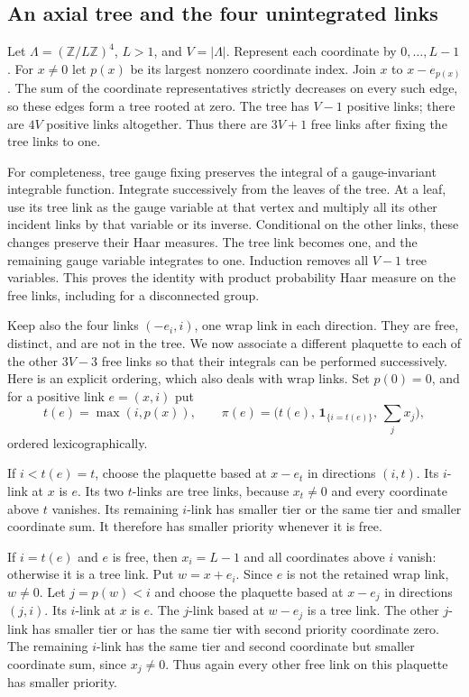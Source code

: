 \subsection{An axial tree and the four unintegrated links}

Let $\Lambda=(\mathbb Z/L\mathbb Z)^4$, $L>1$, and $V=|\Lambda|$.
Represent each coordinate by $0,\ldots,L-1$. For $x\ne0$ let $p(x)$
be its largest nonzero coordinate index. Join $x$ to $x-e_{p(x)}$.
The sum of the coordinate representatives strictly decreases on every
such edge, so these edges form a tree rooted at zero. The tree has
$V-1$ positive links; there are $4V$ positive links altogether. Thus
there are $3V+1$ free links after fixing the tree links to one.

For completeness, tree gauge fixing preserves the integral of a
gauge-invariant integrable function. Integrate successively from the
leaves of the tree. At a leaf, use its tree link as the gauge variable
at that vertex and multiply all its other incident links by that
variable or its inverse. Conditional on the other links, these changes
preserve their Haar measures. The tree link becomes one, and the
remaining gauge variable integrates to one. Induction removes all
$V-1$ tree variables. This proves the identity with product probability
Haar measure on the free links, including for a disconnected group.

Keep also the four links $(-e_i,i)$, one wrap link in each direction.
They are free, distinct, and are not in the tree. We now associate a
different plaquette to each of the other $3V-3$ free links so that their
integrals can be performed successively. Here is an explicit ordering,
which also deals with wrap links. Set $p(0)=0$, and for a positive
link $e=(x,i)$ put
\[
 t(e)=\max(i,p(x)),\qquad
 \pi(e)=\bigl(t(e),\,\mathbf1_{\{i=t(e)\}},\,
                   \textstyle\sum_jx_j\bigr),
\]
ordered lexicographically.

If $i<t(e)=t$, choose the plaquette based at $x-e_t$ in directions
$(i,t)$. Its $i$-link at $x$ is $e$. Its two $t$-links are tree links,
because $x_t\ne0$ and every coordinate above $t$ vanishes. Its remaining
$i$-link has smaller tier or the same tier and smaller coordinate sum.
It therefore has smaller priority whenever it is free.

If $i=t(e)$ and $e$ is free, then $x_i=L-1$ and all coordinates above
$i$ vanish: otherwise it is a tree link. Put $w=x+e_i$. Since $e$ is
not the retained wrap link, $w\ne0$. Let $j=p(w)<i$ and choose the
plaquette based at $x-e_j$ in directions $(j,i)$. Its $i$-link at $x$
is $e$. The $j$-link based at $w-e_j$ is a tree link. The other
$j$-link has smaller tier or has the same tier with second priority
coordinate zero. The remaining $i$-link has the same tier and second
coordinate but smaller coordinate sum, since $x_j\ne0$. Thus again
every other free link on this plaquette has smaller priority.

